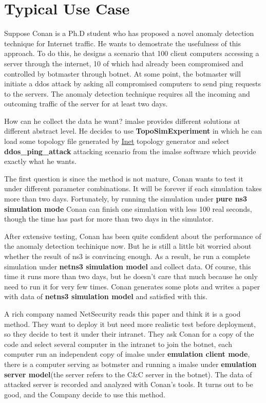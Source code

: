 \documentclass[letterpaper,10pt,english]{sphinxmanual}
\begin{document}
\section{Typical Use Case}
\label{index:typical-use-case}
Suppose Conan is a Ph.D student who has proposed a novel anomaly detection
technique for Internet traffic. He wants to demostrate the usefulness of this
approach. To do this, he designs a scenario that 100 client computers accessing
a server through the internet, 10 of which had already been compromised and
controlled by botmaster through botnet. At some point, the botmaster will
initiate a ddos attack by asking all compromised computers to send ping requests
to the servers. The anomaly detection technique requires all the incoming and
outcoming traffic of the server for at least two days.

How can he collect the data he want? imalse provides different solutions at
different abstract level. He decides to use \textbf{TopoSimExperiment} in which he
can load some topology file generated by \href{http://topology.eecs.umich.edu/inet/}{Inet} topology generator and select
\textbf{ddos\_ping\_attack} attacking scenario from the imalse software which provide
exactly what he wants.

The first question is since the method is not mature, Conan wants to test it
under different parameter combinations. It will be forever if each simulation
takes more than two days. Fortunately, by running the simulation under \textbf{pure
ns3 simulation mode} Conan can finish one simulation with less 100 real
seconds, though the time has past for more than two days in the simulator.

After extensive testing, Conan has been quite confident about the performance of
the anomaly detection techinique now. But he is still a little bit worried about
whether the result of ns3 is convincing enough. As a result, he run a complete
simulation under \textbf{netns3 simulation model} and collect data. Of course, this
time it runs more than two days, but he doesn't care that much because he only
need to run it for very few times. Conan generates some plots and writes a
paper with data of \textbf{netns3 simulation model} and satisfied with this.

A rich company named NetSecurity reads this paper and think it is a good method.
They want to deploy it but need more realistic test before deployment, so they
decide to test it under their intranet. They ask Conan for a copy of the code
and select several computer in the intranet to join the botnet, each computer
run an independent copy of imalse under \textbf{emulation client mode}, there is a
computer serving as botmster and running a imalse under \textbf{emulation server
model}(the server refers to the C\&C server in the botnet). The data of
attacked server is recorded and analyzed with Conan's tools. It turns out to be
good, and the Company decide to use this method.
\end{document}

